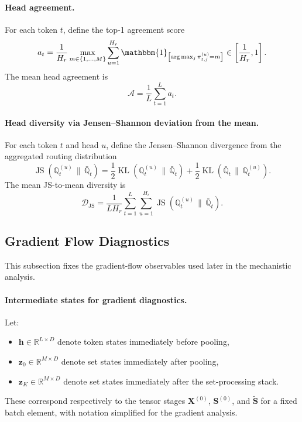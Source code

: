 \documentclass{article}
\theoremstyle{plain}
\theoremstyle{definition}
\theoremstyle{remark}
\begin{document}
\paragraph{Head agreement.}
For each token $t$, define the top-1 agreement score
\begin{equation}
\label{eq:head-agreement-token}
a_t
=
\frac{1}{H_r}
\max_{m\in\{1,\dots,M\}}
\sum_{u=1}^{H_r}
\mathbbm{1}_{\left[\arg\max_j \pi_{t,j}^{(u)}=m\right]}
\in\left[\frac{1}{H_r},1\right].
\end{equation}
The mean head agreement is
\begin{equation}
\label{eq:head-agreement}
\mathcal A
=
\frac{1}{L}\sum_{t=1}^L a_t.
\end{equation}

\paragraph{Head diversity via Jensen--Shannon deviation from the mean.}
For each token $t$ and head $u$, define the Jensen--Shannon divergence from the aggregated routing distribution
\begin{equation}
\label{eq:js-divergence}
\operatorname{JS}(\mathbb Q_t^{(u)}\,\|\,\bar{\mathbb Q}_t)
=
\frac{1}{2}\operatorname{KL}(\mathbb Q_t^{(u)}\,\|\,\bar{\mathbb Q}_t)
+
\frac{1}{2}\operatorname{KL}(\bar{\mathbb Q}_t\,\|\,\mathbb Q_t^{(u)}).
\end{equation}
The mean JS-to-mean diversity is
\begin{equation}
\label{eq:js-diversity}
\mathcal D_{\mathrm{JS}}
=
\frac{1}{LH_r}
\sum_{t=1}^L\sum_{u=1}^{H_r}
\operatorname{JS}(\mathbb Q_t^{(u)}\,\|\,\bar{\mathbb Q}_t).
\end{equation}

\subsection{Gradient Flow Diagnostics}
\label{sec:gradient-flow-diagnostics}

This subsection fixes the gradient-flow observables used later in the mechanistic analysis.

\paragraph{Intermediate states for gradient diagnostics.}
Let:
\begin{itemize}
    \item $\mathbf h\in\mathbb R^{L\times D}$ denote token states immediately before pooling,
    \item $\mathbf z_0\in\mathbb R^{M\times D}$ denote set states immediately after pooling,
    \item $\mathbf z_K\in\mathbb R^{M\times D}$ denote set states immediately after the set-processing stack.
\end{itemize}
These correspond respectively to the tensor stages $\mathbf X^{(0)}$, $\mathbf S^{(0)}$, and $\widetilde{\mathbf S}$ for a fixed batch element, with notation simplified for the gradient analysis.
\end{document}
